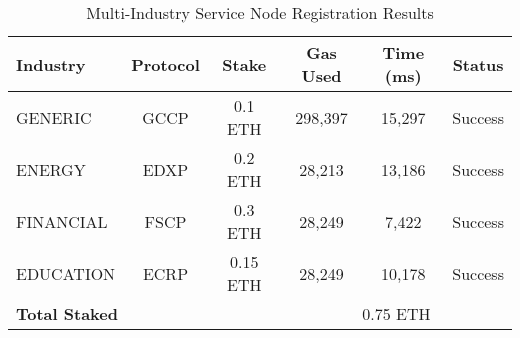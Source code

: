 
\begin{table}[h!]
\centering
\caption{Multi-Industry Service Node Registration Results}
\label{tab:node_registration}
\begin{tabular}{|l|c|c|c|c|c|}
\hline
\textbf{Industry} & \textbf{Protocol} & \textbf{Stake} & \textbf{Gas Used} & \textbf{Time (ms)} & \textbf{Status} \\
\hline
GENERIC & GCCP & 0.1 ETH & 298,397 & 15,297 & Success \\
\hline
ENERGY & EDXP & 0.2 ETH & 28,213 & 13,186 & Success \\
\hline
FINANCIAL & FSCP & 0.3 ETH & 28,249 & 7,422 & Success \\
\hline
EDUCATION & ECRP & 0.15 ETH & 28,249 & 10,178 & Success \\
\hline
\multicolumn{3}{|l|}{\textbf{Total Staked}} & \multicolumn{3}{c|}{0.75 ETH} \\
\hline
\end{tabular}
\end{table}
